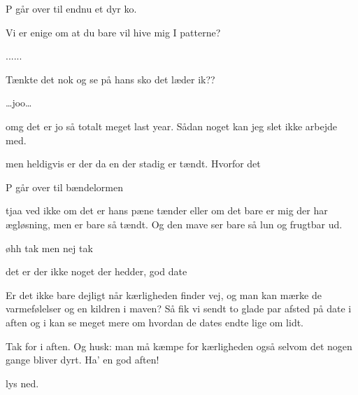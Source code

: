 \documentclass[a4paper,11pt]{article}
\begin{document}
\begin{sketch}
\scene P går over til endnu et dyr ko.

 Vi er enige om at du bare vil hive mig I patterne?

......

 Tænkte det nok og se på hans sko det læder ik??


\ldots joo\ldots

 omg det er jo så totalt meget last year. Sådan noget kan jeg slet ikke arbejde med.

 men heldigvis er der da en der stadig er tændt. Hvorfor det

\scene P går over til bændelormen

 tjaa ved ikke om det er hans pæne tænder eller om det bare er mig der har ægløsning, men er bare så tændt. Og den mave ser bare så lun og frugtbar ud.

øhh tak men nej tak

 det er der ikke noget der hedder, god date


 Er det ikke bare dejligt når kærligheden finder vej, og man kan mærke de varmefølelser og en kildren i maven? Så fik vi sendt to glade par afsted på date i aften og i kan se meget mere om hvordan de dates endte lige om lidt.

 Tak for i aften. Og husk: man må kæmpe for kærligheden også selvom det nogen gange bliver dyrt. Ha' en god aften! 

\scene lys ned.



\end{sketch}
\end{document}
